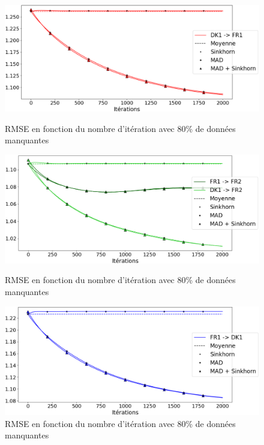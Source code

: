 \documentclass[acmsmall, natbib=false, nonacm]{acmart}
\begin{document}
\begin{figure}[H]
    \begin{minipage}[b]{0.4\linewidth}
		\centering \includegraphics[scale=0.14]{images/80_ar_FR1.png}
		\caption{RMSE en fonction du nombre d'itération avec 80\% de données manquantes}
	\end{minipage}\hfill
    \begin{minipage}[b]{0.4\linewidth}
		\centering \includegraphics[scale=0.14]{images/80_ar_FR2.png}
		\caption{RMSE en fonction du nombre d'itération avec 80\% de données manquantes}
	\end{minipage}\hfill
    \begin{minipage}[b]{0.4\linewidth}
		\centering \includegraphics[scale=0.14]{images/80_ar_DK1.png}
		\caption{RMSE en fonction du nombre d'itération avec 80\% de données manquantes}
	\end{minipage}\hfill

\end{figure}
\end{document}
